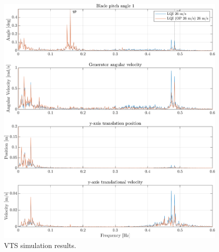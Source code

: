 \begin{figure}[ht]
	\centering
	\includegraphics[width=0.7\linewidth]{Graphics/TestResults/VTSplotting/31_fft_th_w_py_vy.png}
	\caption{VTS simulation results.}
	\label{fig:vts_31_fft_th_w_py_vy}
\end{figure}
